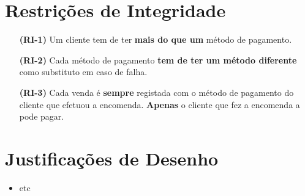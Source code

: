 \documentclass[12pt,a4paper]{article}
\begin{document}
  \section*{Restrições de Integridade}
  \footnotesize
  \begin{itemize}
    \item[\textbf{(RI-1)}] Um cliente tem de ter \textbf{mais do que um} método de pagamento.
    \item[\textbf{(RI-2)}] Cada método de pagamento \textbf{tem de ter um método diferente} como substituto em caso de falha.
    \item[\textbf{(RI-3)}] Cada venda é \textbf{sempre} registada com o método de pagamento do cliente que efetuou a encomenda. \textbf{Apenas} o cliente que fez a encomenda a pode pagar.
  \end{itemize}

  \section*{Justificações de Desenho}
  \normalsize
  \begin{itemize}
    \item etc
  \end{itemize}
\end{document}

